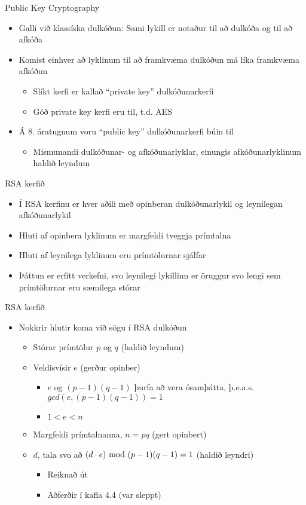 \documentclass[handout]{beamer}
\begin{document}
\begin{frame}{Public Key Cryptography}
\begin{itemize}
 \item Galli við klassíska dulkóðun: Sami lykill er notaður til að dulkóða og til að afkóða
 \item Komist einhver að lyklinum til að framkvæma dulkóðun má líka framkvæma afkóðun
 \begin{itemize}
  \item Slíkt kerfi er kallað ``private key'' dulkóðunarkerfi
  \item Góð private key kerfi eru til, t.d. AES
 \end{itemize}
 \item Á 8. áratugnum voru ``public key'' dulkóðunarkerfi búin til
 \begin{itemize}
  \item Mismunandi dulkóðunar- og afkóðunarlyklar, einungis afkóðunarlyklinum haldið leyndum
 \end{itemize}
\end{itemize}
\end{frame}

\begin{frame}{RSA kerfið}
\begin{itemize}
 \item Í RSA kerfinu er hver aðili með opinberan dulkóðunarlykil og leynilegan afkóðunarlykil
 \item Hluti af opinbera lyklinum er margfeldi tveggja prímtalna
 \item Hluti af leynilega lyklinum eru prímtölurnar sjálfar
 \item Þáttun er erfitt verkefni, svo leynilegi lykillinn er öruggur svo lengi sem prímtölurnar eru sæmilega stórar
\end{itemize}
\end{frame}

\begin{frame}{RSA kerfið}
\begin{itemize}
 \item Nokkrir hlutir koma við sögu í RSA dulkóðun
 \begin{itemize}
  \item Stórar prímtölur $p$ og $q$ (haldið leyndum)
  \item Veldisvísir $e$ (gerður opinber)
  \begin{itemize}
   \item $e$ og $(p-1)(q-1)$ þurfa að vera ósamþátta, þ.e.a.s. $gcd(e, (p-1)(q-1)) = 1$
   \item $1 < e < n$
  \end{itemize}
  \item Margfeldi prímtalnanna, $n = pq$ (gert opinbert)
  \item $d$, tala svo að $(d\cdot e) \ \text{mod}\ (p-1)(q-1) = 1$ (haldið leyndri)
  \begin{itemize}
   \item Reiknað út
   \item Aðferðir í kafla 4.4 (var sleppt)
  \end{itemize}
 \end{itemize}
\end{itemize}
\end{frame}
\end{document}
